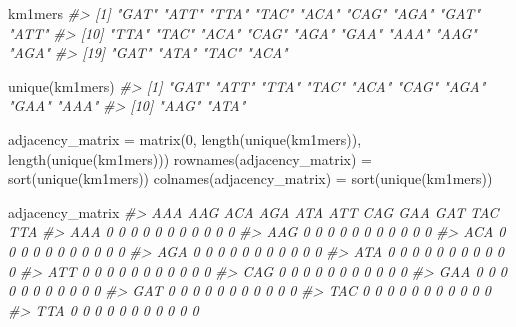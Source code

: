 \documentclass[
]{book}
\newenvironment{Shaded}{\begin{snugshade}}{\end{snugshade}}
\newcommand{\CommentTok}[1]{\textcolor[rgb]{0.56,0.35,0.01}{\textit{#1}}}
\newcommand{\DecValTok}[1]{\textcolor[rgb]{0.00,0.00,0.81}{#1}}
\newcommand{\FunctionTok}[1]{\textcolor[rgb]{0.00,0.00,0.00}{#1}}
\newcommand{\NormalTok}[1]{#1}
\newcommand{\OtherTok}[1]{\textcolor[rgb]{0.56,0.35,0.01}{#1}}
\begin{document}
\begin{Shaded}
\begin{Highlighting}[]
\NormalTok{km1mers}
\CommentTok{\#\textgreater{}  [1] "GAT" "ATT" "TTA" "TAC" "ACA" "CAG" "AGA" "GAT" "ATT"}
\CommentTok{\#\textgreater{} [10] "TTA" "TAC" "ACA" "CAG" "AGA" "GAA" "AAA" "AAG" "AGA"}
\CommentTok{\#\textgreater{} [19] "GAT" "ATA" "TAC" "ACA"}
\end{Highlighting}
\end{Shaded}

\begin{Shaded}
\begin{Highlighting}[]
\FunctionTok{unique}\NormalTok{(km1mers)}
\CommentTok{\#\textgreater{}  [1] "GAT" "ATT" "TTA" "TAC" "ACA" "CAG" "AGA" "GAA" "AAA"}
\CommentTok{\#\textgreater{} [10] "AAG" "ATA"}
\end{Highlighting}
\end{Shaded}

\begin{Shaded}
\begin{Highlighting}[]
\NormalTok{adjacency\_matrix }\OtherTok{=} \FunctionTok{matrix}\NormalTok{(}\DecValTok{0}\NormalTok{, }\FunctionTok{length}\NormalTok{(}\FunctionTok{unique}\NormalTok{(km1mers)), }\FunctionTok{length}\NormalTok{(}\FunctionTok{unique}\NormalTok{(km1mers)))}
\FunctionTok{rownames}\NormalTok{(adjacency\_matrix) }\OtherTok{=} \FunctionTok{sort}\NormalTok{(}\FunctionTok{unique}\NormalTok{(km1mers))}
\FunctionTok{colnames}\NormalTok{(adjacency\_matrix) }\OtherTok{=} \FunctionTok{sort}\NormalTok{(}\FunctionTok{unique}\NormalTok{(km1mers))}

\NormalTok{adjacency\_matrix}
\CommentTok{\#\textgreater{}     AAA AAG ACA AGA ATA ATT CAG GAA GAT TAC TTA}
\CommentTok{\#\textgreater{} AAA   0   0   0   0   0   0   0   0   0   0   0}
\CommentTok{\#\textgreater{} AAG   0   0   0   0   0   0   0   0   0   0   0}
\CommentTok{\#\textgreater{} ACA   0   0   0   0   0   0   0   0   0   0   0}
\CommentTok{\#\textgreater{} AGA   0   0   0   0   0   0   0   0   0   0   0}
\CommentTok{\#\textgreater{} ATA   0   0   0   0   0   0   0   0   0   0   0}
\CommentTok{\#\textgreater{} ATT   0   0   0   0   0   0   0   0   0   0   0}
\CommentTok{\#\textgreater{} CAG   0   0   0   0   0   0   0   0   0   0   0}
\CommentTok{\#\textgreater{} GAA   0   0   0   0   0   0   0   0   0   0   0}
\CommentTok{\#\textgreater{} GAT   0   0   0   0   0   0   0   0   0   0   0}
\CommentTok{\#\textgreater{} TAC   0   0   0   0   0   0   0   0   0   0   0}
\CommentTok{\#\textgreater{} TTA   0   0   0   0   0   0   0   0   0   0   0}
\end{Highlighting}
\end{Shaded}
\end{document}
